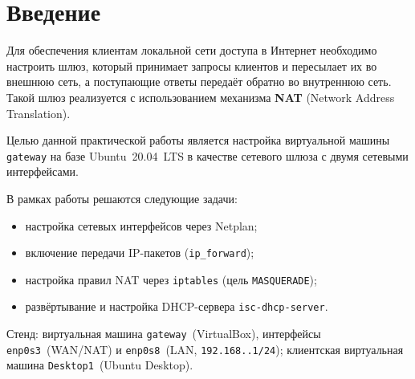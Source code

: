 \chapter*{Введение}
\label{ch:intro}

Для обеспечения клиентам локальной сети доступа в Интернет необходимо настроить шлюз,
который принимает запросы клиентов и пересылает их во внешнюю сеть, а поступающие
ответы передаёт обратно во внутреннюю сеть. Такой шлюз реализуется с использованием
механизма \textbf{NAT} (Network Address Translation).

Целью данной практической работы является настройка виртуальной машины
\texttt{gateway} на базе Ubuntu~20.04~LTS в качестве сетевого шлюза с двумя сетевыми
интерфейсами.

В рамках работы решаются следующие задачи:
\begin{itemize}
  \item настройка сетевых интерфейсов через Netplan;
  \item включение передачи IP-пакетов (\texttt{ip\_forward});
  \item настройка правил NAT через \texttt{iptables} (цель \texttt{MASQUERADE});
  \item развёртывание и настройка DHCP-сервера \texttt{isc-dhcp-server}.
\end{itemize}

Стенд: виртуальная машина \texttt{gateway}~(VirtualBox),
интерфейсы \texttt{enp0s3}~(WAN/NAT) и \texttt{enp0s8}~(LAN,
\texttt{192.168.\cfgLabStudentN.1/24});
клиентская виртуальная машина \texttt{Desktop1}~(Ubuntu Desktop).
